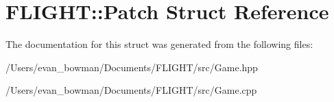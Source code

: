 \hypertarget{struct_f_l_i_g_h_t_1_1_patch}{}\section{F\+L\+I\+G\+HT\+:\+:Patch Struct Reference}
\label{struct_f_l_i_g_h_t_1_1_patch}


The documentation for this struct was generated from the following files\+:\begin{DoxyCompactItemize}
\item 
/\+Users/evan\+\_\+bowman/\+Documents/\+F\+L\+I\+G\+H\+T/src/Game.\+hpp\item 
/\+Users/evan\+\_\+bowman/\+Documents/\+F\+L\+I\+G\+H\+T/src/Game.\+cpp\end{DoxyCompactItemize}
